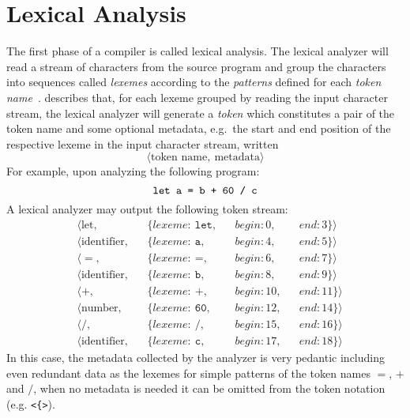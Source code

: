 \documentclass[
    oneside,
    english,
    coorientadorbanca,
    embeddedlogo,
    noabntexcite
]{ufsc-thesis-rn46-2019}
\begin{document}
\section{Lexical Analysis}\label{chapter:background:sec:lexical}

The first phase of a compiler is called lexical analysis.
The lexical analyzer will read a stream of characters from the source program and group the characters into sequences called \textit{lexemes} according to the \textit{patterns} defined for each \textit{token name}~\cite{Aho:2006:CPT:1177220}.
\textcite{Aho:2006:CPT:1177220} describes that, for each lexeme grouped by reading the input character stream, the lexical analyzer will generate a \textit{token} which constitutes a pair of the token name and some optional metadata, e.g.\ the start and end position of the respective lexeme in the input character stream, written
\begin{equation*}
    \langle \textrm{token name},\ \textrm{metadata}\rangle
\end{equation*}
For example, upon analyzing the following program:
\begin{equation*}
    \verb|let a = b + 60 / c|
\end{equation*}
A lexical analyzer may output the following token stream:
\begin{equation}\label{figure:introduction_token_stream}
    \begin{aligned}
         & \langle \textrm{let},        &  & \{lexeme:\ \texttt{let}, &  & begin: 0,  &  & end: 3\}\rangle  \\
         & \langle \textrm{identifier}, &  & \{lexeme:\ \texttt{a},   &  & begin: 4,  &  & end: 5\}\rangle  \\
         & \langle =,                   &  & \{lexeme:\ \texttt{=},   &  & begin: 6,  &  & end: 7\}\rangle  \\
         & \langle \textrm{identifier}, &  & \{lexeme:\ \texttt{b},   &  & begin: 8,  &  & end: 9\}\rangle  \\
         & \langle +,                   &  & \{lexeme:\ +,            &  & begin: 10, &  & end: 11\}\rangle \\
         & \langle \textrm{number},     &  & \{lexeme:\ \texttt{60},  &  & begin: 12, &  & end: 14\}\rangle \\
         & \langle /,                   &  & \{lexeme:\ /,            &  & begin: 15, &  & end: 16\}\rangle \\
         & \langle \textrm{identifier}, &  & \{lexeme:\ \texttt{c},   &  & begin: 17, &  & end: 18\}\rangle
    \end{aligned}
\end{equation}
In this case, the metadata collected by the analyzer is very pedantic including even redundant data as the lexemes for simple patterns of the token names $=$, $+$ and $/$, when no metadata is needed it can be omitted from the token notation (e.g. \verb+<{>+).
\end{document}
